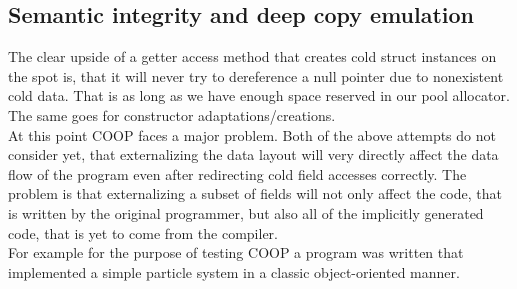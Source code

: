 \subsection{Semantic integrity and deep copy emulation}\label{deep_copy_emulation}
The clear upside of a getter access method that creates cold struct instances on the spot is, that it will never try to dereference a null pointer due to nonexistent cold data. That is as long as we have enough space reserved in our pool allocator. The same goes for constructor adaptations/creations.\\
At this point COOP faces a major problem. Both of the above attempts do not consider yet, that externalizing the data layout will very directly affect the data flow of the program even after redirecting cold field accesses correctly. The problem is that externalizing a subset of fields will not only affect the code, that is written by the original programmer, but also all of the implicitly generated code, that is yet to come from the compiler.\\
For example for the purpose of testing COOP a program was written that implemented a simple particle system in a classic object-oriented manner.

